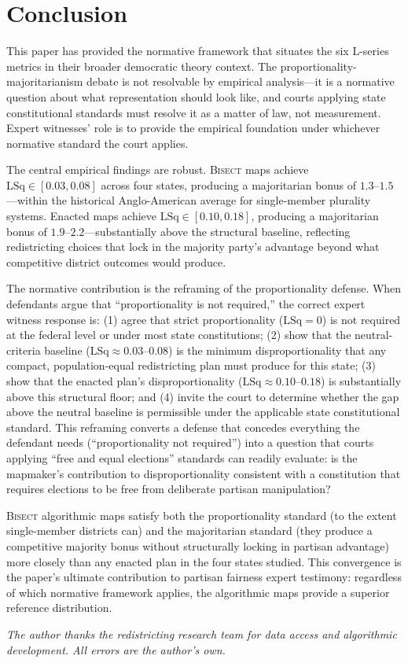 \section{Conclusion}
\label{sec:conclusion}

This paper has provided the normative framework that situates the six L-series
metrics in their broader democratic theory context. The proportionality-majoritarianism
debate is not resolvable by empirical analysis---it is a normative question about
what representation should look like, and courts applying state constitutional
standards must resolve it as a matter of law, not measurement. Expert witnesses'
role is to provide the empirical foundation under whichever normative standard
the court applies.

The central empirical findings are robust. \textsc{Bisect} maps achieve
$\text{LSq} \in [0.03, 0.08]$ across four states, producing a majoritarian bonus
of $1.3$--$1.5$---within the historical Anglo-American average for single-member
plurality systems. Enacted maps achieve $\text{LSq} \in [0.10, 0.18]$, producing
a majoritarian bonus of $1.9$--$2.2$---substantially above the structural baseline,
reflecting redistricting choices that lock in the majority party's advantage
beyond what competitive district outcomes would produce.

The normative contribution is the reframing of the proportionality defense. When
defendants argue that ``proportionality is not required,'' the correct expert
witness response is: (1) agree that strict proportionality ($\text{LSq} = 0$)
is not required at the federal level or under most state constitutions; (2) show
that the neutral-criteria baseline ($\text{LSq} \approx 0.03$--$0.08$) is the
minimum disproportionality that any compact, population-equal redistricting plan
must produce for this state; (3) show that the enacted plan's disproportionality
($\text{LSq} \approx 0.10$--$0.18$) is substantially above this structural floor;
and (4) invite the court to determine whether the gap above the neutral baseline
is permissible under the applicable state constitutional standard. This reframing
converts a defense that concedes everything the defendant needs (``proportionality
not required'') into a question that courts applying ``free and equal elections''
standards can readily evaluate: is the mapmaker's contribution to disproportionality
consistent with a constitution that requires elections to be free from deliberate
partisan manipulation?

\textsc{Bisect} algorithmic maps satisfy both the proportionality standard (to
the extent single-member districts can) and the majoritarian standard (they
produce a competitive majority bonus without structurally locking in partisan
advantage) more closely than any enacted plan in the four states studied.
This convergence is the paper's ultimate contribution to partisan fairness expert
testimony: regardless of which normative framework applies, the algorithmic maps
provide a superior reference distribution.

\bigskip

\noindent\textit{The author thanks the redistricting research team for data
access and algorithmic development. All errors are the author's own.}
